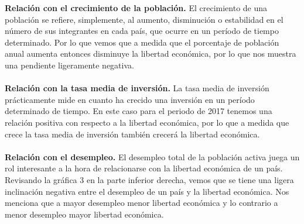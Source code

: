 	\textbf{Relación con el crecimiento de la población.}
	El crecimiento de una población se refiere, simplemente, al aumento, disminución o estabilidad en el número de sus integrantes en cada país, que ocurre en un período de tiempo determinado. Por lo que  vemos que a medida que el porcentaje de población anual aumenta entonces disminuye la libertad económica, por lo que nos muestra una pendiente ligeramente negativa.\\\\
    

	\textbf{Relación con la tasa media de inversión.}
	La tasa media de inversión prácticamente mide en cuanto ha crecido una inversión en un período determinado de tiempo. En este caso para el periodo de 2017 tenemos una relación positiva con respecto a la libertad económica, por lo que a medida que crece la tasa media de inversión también crecerá la libertad económica.\\\\

	\textbf{Relación con el desempleo.}
	El desempleo total de la población activa juega un rol interesante a la hora de relacionarse con la libertad económica de un país.\\
	Revisando la gráfica 3 en la parte inferior derecha, vemos que se tiene una ligera inclinación negativa entre el desempleo de un país y la libertad económica. Nos menciona que a mayor desempleo menor libertad económica y lo contrario a menor desempleo mayor libertad económica.  


